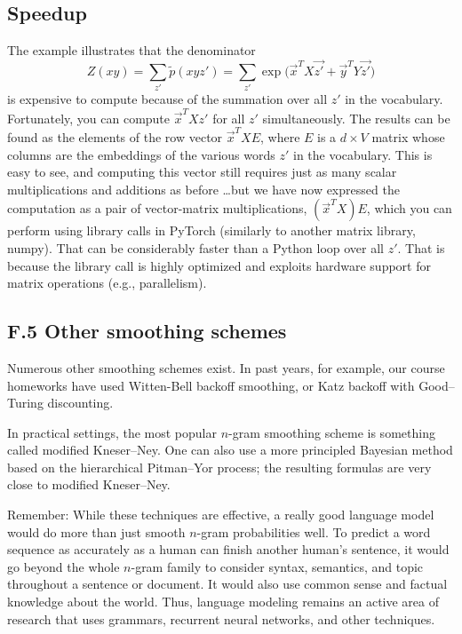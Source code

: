 \subsection*{Speedup}
The example illustrates that the denominator
\[
Z(xy) = \sum_{z'} \tilde{p}(xyz') = \sum_{z'} \exp\big(\vec{x}^T X \vec{z'} + \vec{y}^T Y \vec{z'}\big)
\tag{13}
\]
is expensive to compute because of the summation over all $z'$ in the vocabulary. Fortunately, you can compute $\vec{x}^T X z'$ for all $z'$ simultaneously. The results can be found as the elements of the row vector $\vec{x}^T X E$, where $E$ is a $d \times V$ matrix whose columns are the embeddings of the various words $z'$ in the vocabulary. This is easy to see, and computing this vector still requires just as many scalar multiplications and additions as before \ldots but we have now expressed the computation as a pair of vector-matrix multiplications, $(\vec{x}^T X)E$, which you can perform using library calls in PyTorch (similarly to another matrix library, numpy). That can be considerably faster than a Python loop over all $z'$. That is because the library call is highly optimized and exploits hardware support for matrix operations (e.g., parallelism).

\subsection*{F.5 Other smoothing schemes}
Numerous other smoothing schemes exist. In past years, for example, our course homeworks have used Witten-Bell backoff smoothing, or Katz backoff with Good–Turing discounting.  

In practical settings, the most popular $n$-gram smoothing scheme is something called modified Kneser–Ney. One can also use a more principled Bayesian method based on the hierarchical Pitman–Yor process; the resulting formulas are very close to modified Kneser–Ney.  

Remember: While these techniques are effective, a really good language model would do more than just smooth $n$-gram probabilities well. To predict a word sequence as accurately as a human can finish another human’s sentence, it would go beyond the whole $n$-gram family to consider syntax, semantics, and topic throughout a sentence or document. It would also use common sense and factual knowledge about the world. Thus, language modeling remains an active area of research that uses grammars, recurrent neural networks, and other techniques.  

